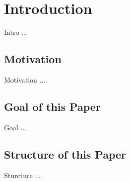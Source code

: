 \chapter{Introduction}
\label{cha:Introduction}

Intro ...

\section{Motivation}
\label{sec:Motivation}

Motivation ...

\section{Goal of this Paper}
\label{sec:GoalOfThisPaper}

Goal ...

\section{Structure of this Paper}
\label{sec:StructuerOfThisPaper}

Sturcture ...
